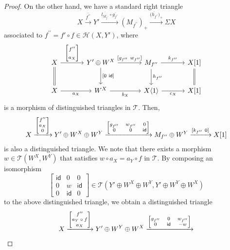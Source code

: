 \documentclass[a4paper,reqno,10pt]{amsart}
\DeclareRobustCommand{\darkblueedit}[1]{#1}
\theoremstyle{definition}
\theoremstyle{definition}
\theoremstyle{definition}
\theoremstyle{definition}
\theoremstyle{plain}
\newcommand{\id}{\mathsf{id}}
\newcommand{\CH}{\mathcal{H}}
\newcommand{\CT}{\mathcal{T}}
\begin{document}
\begin{proof}
On the other hand, we have a standard right triangle
\color{blue}
\[
X\xrightarrow{\overline{f^{\prime\prime}}}Y'\xrightarrow{\overline{l_{M_{f^{\prime\prime}}}}\darkblueedit{\circ}\overline{g_{f^{\prime\prime}}}}(M_{f^{\prime\prime}})_+\xrightarrow{\overline{(h_{f^{\prime\prime}}})_+}\Sigma X
\]
\normalcolor
associated to $f^{\prime\prime}=f'\circ f\in\CH(X,Y')$, where
\[
\begin{tikzcd}[row sep=0.8cm, column sep=1.2cm]
X \arrow{r}{\begin{bmatrix}f^{\prime\prime}\\ a_X\end{bmatrix}}\arrow[d, equal]
&Y'\oplus W^X \arrow{d}{{[}0\ \id{]}} \arrow{r}{{[}g_{f^{\prime\prime}}\ w_{f^{\prime\prime}}{]}}
&M_{f^{\prime\prime}}\arrow{r}{k_{f^{\prime\prime}}} \arrow{d}{h_{f^{\prime\prime}}}
&X{[}1{]} \arrow[d, equal]
\\
X\arrow{r}[swap]{a_X}
&W^X\arrow{r}[swap]{b_X}
&X \langle1\rangle \arrow{r}[swap]{c_X}
&X{[}1{]}
\end{tikzcd}
\]
is a morphism of distinguished triangles in $\CT$.
Then, 
\[
X
\xrightarrow{{\scriptsize\begin{bmatrix}f^{\prime\prime}\\a_X\\0\end{bmatrix}}}
Y'\oplus W^X\oplus W^Y
\xrightarrow{{\scriptsize\begin{bmatrix}g_{f^{\prime\prime}}&w_{f^{\prime\prime}}&0\\ 0&0&\id\end{bmatrix}}}
M_{f^{\prime\prime}}\oplus W^Y
\xrightarrow{[k_{f^{\prime\prime}}\ 0]}
X[1]
\]
is also a distinguished triangle.
We note that there exists a morphism $w\in\CT(W^X,W^Y)$ that satisfies $w\circ a_X=a_Y\circ f$ in $\CT$.
By composing an isomorphism
\[
\begin{bmatrix}
\id&0&0\\
0&w&\id\\
0&\id&0
\end{bmatrix}\in\CT(Y'\oplus W^X\oplus W^Y,Y'\oplus W^Y\oplus W^X)
\]
to the above distinguished triangle, we obtain a distinguished triangle
\[
X
\xrightarrow{{\scriptsize\begin{bmatrix}f^{\prime\prime}\\a_Y\circ f\\a_X\end{bmatrix}}}
Y'\oplus W^Y\oplus W^X
\xrightarrow{{\scriptsize\begin{bmatrix}g_{f^{\prime\prime}}&0&w_{f^{\prime\prime}}\\ 0&\id&-w\end{bmatrix}}}
\]
\end{proof}
\end{document}
